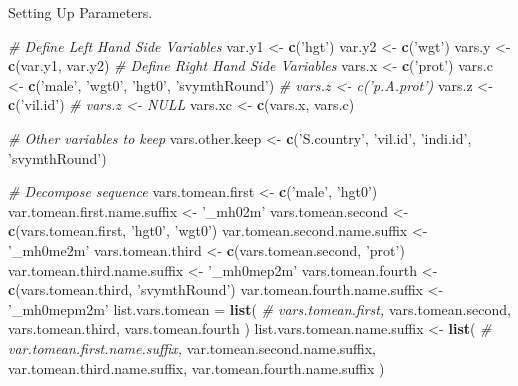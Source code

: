 \documentclass[
]{book}
\newenvironment{Shaded}{\begin{snugshade}}{\end{snugshade}}
\newcommand{\CommentTok}[1]{\textcolor[rgb]{0.56,0.35,0.01}{\textit{#1}}}
\newcommand{\KeywordTok}[1]{\textcolor[rgb]{0.13,0.29,0.53}{\textbf{#1}}}
\newcommand{\NormalTok}[1]{#1}
\newcommand{\StringTok}[1]{\textcolor[rgb]{0.31,0.60,0.02}{#1}}
\begin{document}
Setting Up Parameters.

\begin{Shaded}
\begin{Highlighting}[]
\CommentTok{# Define Left Hand Side Variables}
\NormalTok{var.y1 <-}\StringTok{ }\KeywordTok{c}\NormalTok{(}\StringTok{'hgt'}\NormalTok{)}
\NormalTok{var.y2 <-}\StringTok{ }\KeywordTok{c}\NormalTok{(}\StringTok{'wgt'}\NormalTok{)}
\NormalTok{vars.y <-}\StringTok{ }\KeywordTok{c}\NormalTok{(var.y1, var.y2)}
\CommentTok{# Define Right Hand Side Variables}
\NormalTok{vars.x <-}\StringTok{ }\KeywordTok{c}\NormalTok{(}\StringTok{'prot'}\NormalTok{)}
\NormalTok{vars.c <-}\StringTok{ }\KeywordTok{c}\NormalTok{(}\StringTok{'male'}\NormalTok{, }\StringTok{'wgt0'}\NormalTok{, }\StringTok{'hgt0'}\NormalTok{, }\StringTok{'svymthRound'}\NormalTok{)}
\CommentTok{# vars.z <- c('p.A.prot')}
\NormalTok{vars.z <-}\StringTok{ }\KeywordTok{c}\NormalTok{(}\StringTok{'vil.id'}\NormalTok{)}
\CommentTok{# vars.z <- NULL}
\NormalTok{vars.xc <-}\StringTok{ }\KeywordTok{c}\NormalTok{(vars.x, vars.c)}

\CommentTok{# Other variables to keep}
\NormalTok{vars.other.keep <-}\StringTok{ }\KeywordTok{c}\NormalTok{(}\StringTok{'S.country'}\NormalTok{, }\StringTok{'vil.id'}\NormalTok{, }\StringTok{'indi.id'}\NormalTok{, }\StringTok{'svymthRound'}\NormalTok{)}

\CommentTok{# Decompose sequence}
\NormalTok{vars.tomean.first <-}\StringTok{ }\KeywordTok{c}\NormalTok{(}\StringTok{'male'}\NormalTok{, }\StringTok{'hgt0'}\NormalTok{)}
\NormalTok{var.tomean.first.name.suffix <-}\StringTok{ '_mh02m'}
\NormalTok{vars.tomean.second <-}\StringTok{ }\KeywordTok{c}\NormalTok{(vars.tomean.first, }\StringTok{'hgt0'}\NormalTok{, }\StringTok{'wgt0'}\NormalTok{)}
\NormalTok{var.tomean.second.name.suffix <-}\StringTok{ '_mh0me2m'}
\NormalTok{vars.tomean.third <-}\StringTok{ }\KeywordTok{c}\NormalTok{(vars.tomean.second, }\StringTok{'prot'}\NormalTok{)}
\NormalTok{var.tomean.third.name.suffix <-}\StringTok{ '_mh0mep2m'}
\NormalTok{vars.tomean.fourth <-}\StringTok{ }\KeywordTok{c}\NormalTok{(vars.tomean.third, }\StringTok{'svymthRound'}\NormalTok{)}
\NormalTok{var.tomean.fourth.name.suffix <-}\StringTok{ '_mh0mepm2m'}
\NormalTok{list.vars.tomean =}\StringTok{ }\KeywordTok{list}\NormalTok{(}
\CommentTok{#                         vars.tomean.first,}
\NormalTok{                        vars.tomean.second,}
\NormalTok{                        vars.tomean.third,}
\NormalTok{                        vars.tomean.fourth}
\NormalTok{                        )}
\NormalTok{list.vars.tomean.name.suffix <-}\StringTok{ }\KeywordTok{list}\NormalTok{(}
\CommentTok{#                                     var.tomean.first.name.suffix,}
\NormalTok{                                     var.tomean.second.name.suffix,}
\NormalTok{                                     var.tomean.third.name.suffix,}
\NormalTok{                                     var.tomean.fourth.name.suffix}
\NormalTok{                                    )}
\end{Highlighting}
\end{Shaded}
\end{document}
